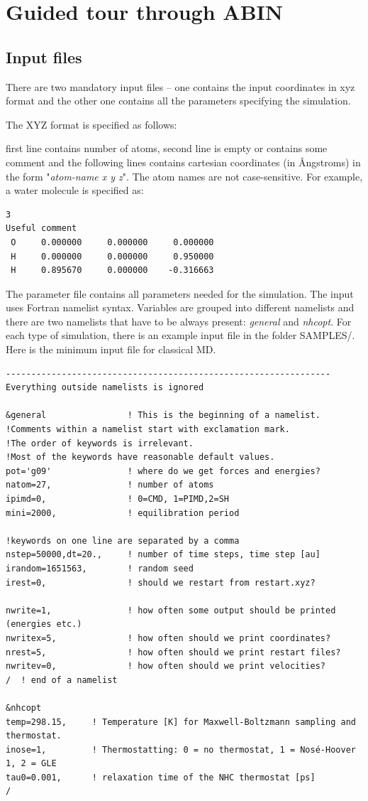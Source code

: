 \section{Guided tour through ABIN}
\subsection{Input files}

There are two mandatory input files -- one contains the input coordinates in xyz format and the other one contains all the parameters specifying the simulation.

The XYZ format is specified as follows:

first line contains number of atoms, second line is empty or contains some comment and the following lines contains cartesian coordinates (in \AA ngstroms) in the form "\textit{atom-name	x y z}". The atom names are not case-sensitive. For example, a water molecule is specified as:

\begin{verbatim}
3
Useful comment
 O     0.000000     0.000000     0.000000
 H     0.000000     0.000000     0.950000
 H     0.895670     0.000000    -0.316663
\end{verbatim}

The parameter file contains all parameters needed for the simulation.
The input uses Fortran namelist syntax.
Variables are grouped into different namelists and there are two namelists that have to be always present: \textit{general} and \textit{nhcopt}. For each type of simulation, there is an example input file in
the folder SAMPLES/. Here is the minimum input file for classical MD.

\begin{verbatim}
----------------------------------------------------------------
Everything outside namelists is ignored

&general                ! This is the beginning of a namelist.
!Comments within a namelist start with exclamation mark.
!The order of keywords is irrelevant.
!Most of the keywords have reasonable default values.
pot='g09'               ! where do we get forces and energies?
natom=27,               ! number of atoms
ipimd=0,                ! 0=CMD, 1=PIMD,2=SH
mini=2000,              ! equilibration period

!keywords on one line are separated by a comma
nstep=50000,dt=20.,     ! number of time steps, time step [au]
irandom=1651563,        ! random seed
irest=0,                ! should we restart from restart.xyz?

nwrite=1,               ! how often some output should be printed (energies etc.)
nwritex=5,              ! how often should we print coordinates?
nrest=5,                ! how often should we print restart files?
nwritev=0,              ! how often should we print velocities?
/  ! end of a namelist

&nhcopt
temp=298.15,     ! Temperature [K] for Maxwell-Boltzmann sampling and thermostat.
inose=1,         ! Thermostatting: 0 = no thermostat, 1 = Nosé-Hoover 1, 2 = GLE
tau0=0.001,      ! relaxation time of the NHC thermostat [ps]
/

\end{verbatim}

